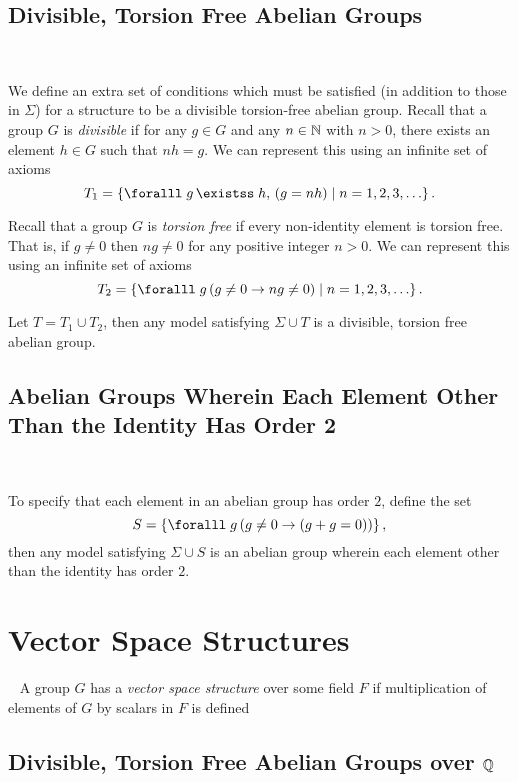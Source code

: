 \subsection{Divisible, Torsion Free Abelian Groups}~\label{sec:axioms-div}

We define an extra set of conditions
which must be satisfied (in addition to those in $\Sigma$)
for a structure to be a divisible torsion-free abelian group.
Recall that a group $G$ is \emph{divisible} if for any $g \in G$
and any $n \in \mathbb{N}$ with $n > 0$, there exists an element $h \in G$
such that $n h = g$.
We can represent this using an infinite set of axioms
\[ T_1 = \set{ \forall g\, \exists h,\, (g = nh) \mid n = 1, 2, 3, \ldots }. \]

Recall that a group $G$ is \emph{torsion free} if every non-identity element
is torsion free. That is, if $g \neq 0$ then $ng \neq 0$ for any positive
integer $n > 0$. We can represent this using an infinite set of axioms
\[ T_2 = \set{ \forall g\, (g \neq 0 \lto ng \neq 0) \mid n = 1, 2, 3, \ldots }. \]

Let $T = T_1 \cup T_2$, then any model satisfying $\Sigma \cup T$
is a divisible, torsion free abelian group.



\subsection{Abelian Groups Wherein Each Element Other Than the Identity
Has Order 2}~\label{sec:axiom-order-two}

To specify that each element in an abelian group has order $2$,
define the set
\[ S = \set{\forall g\, ( g \neq 0 \lto (g + g = 0) ) }, \]
then any model satisfying $\Sigma \cup S$ is an abelian group
wherein each element other than the identity has order $2$.


\section{Vector Space Structures}~\label{sec:vec-space-structures}
A group $G$ has a \emph{vector space structure} over some field $F$
if multiplication of elements of $G$ by scalars in $F$ is defined

\subsection{Divisible, Torsion Free Abelian Groups over \texorpdfstring{$\mathbb{Q}$}{Q}}
~\label{sec:adiv-torsion-free-abelian-groups}

